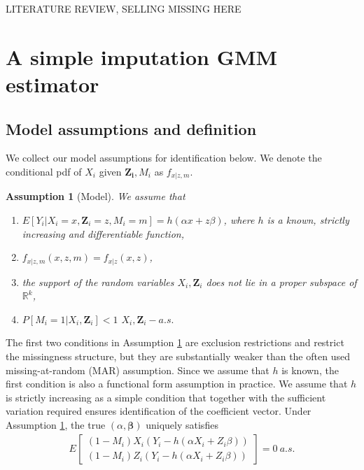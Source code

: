 \documentclass{article}
\newtheorem{assumption}{Assumption}
\theoremstyle{definition}
\theoremstyle{remark}
\begin{document}
{\color{red} LITERATURE REVIEW, SELLING MISSING HERE}

\section{A simple imputation GMM estimator}

\subsection{Model assumptions and definition}
We collect our model assumptions for identification below. We denote the conditional pdf of $X_i$ given $\mathbf{Z_i}, M_i$ as $f_{x|z,m}$.
\begin{assumption}[Model] \label{ass_model}
We assume that
\begin{enumerate}
\item $E[Y_i|X_i=x,\mathbf{Z}_i=z, M_i=m]= h(\alpha x+z\beta)$, where $h$ is a known, strictly increasing and differentiable function,
\item $f_{x|z, m}(x,z,m)= f_{x|z}(x,z)$,
\item the support of the random variables $X_i, \mathbf{Z}_i$ does not lie in a  proper subspace of $\mathbb{R}^k$,
\item $P[M_i=1|X_i,\mathbf{Z}_i]<1$ $X_i,\mathbf{Z}_i-a.s.$
\end{enumerate}
\end{assumption}
The first two conditions in Assumption \ref{ass_model} are exclusion restrictions and restrict the missingness structure, but they are substantially weaker than the often used missing-at-random (MAR) assumption. Since we assume that $h$ is known, the first condition is also a functional form assumption in practice. We assume that $h$ is strictly increasing as a simple condition that together with the sufficient variation required ensures identification of the coefficient vector. Under Assumption \ref{ass_model}, the true $(\alpha, \mathbf{\beta})$ uniquely satisfies
\begin{align}
E\left[\begin{array}{c}
(1-M_i) X_i(Y_i- h(\alpha X_i+Z_i\beta))  \\
(1-M_i) Z_i(Y_i- h(\alpha X_i+Z_i\beta))
\end{array}\right]=0 \ a.s.
\end{align} 
\end{document}
